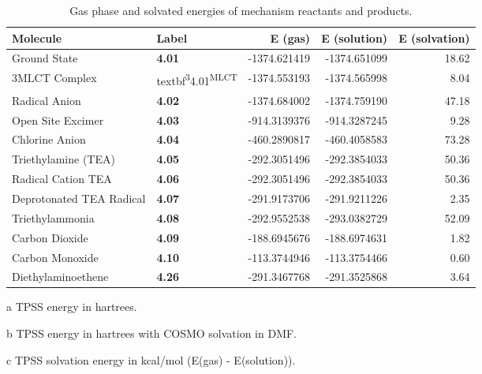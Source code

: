 \begin{table}[!htb]
\centering
 \begin{threeparttable}
  \caption[Gas phase and solvated energies for mechanism reactants and products]{Gas phase and solvated energies of mechanism reactants and products.}
    \begin{tabular}{llrrr}
    \toprule
    Molecule & Label & E (gas)\tnote{a} & E (solution)\tnote{b} & E (solvation)\tnote{c} \\
    \midrule
    Ground State & \textbf{4.01} & -1374.621419 & -1374.651099 & 18.62 \\
    3MLCT Complex & textbf{\textsuperscript{3}4.01\textsuperscript{MLCT}} & -1374.553193 & -1374.565998 & 8.04 \\
    Radical Anion & \textbf{4.02} & -1374.684002 & -1374.759190 & 47.18 \\
    Open Site Excimer & \textbf{4.03} & -914.3139376 & -914.3287245 & 9.28 \\
    Chlorine Anion & \textbf{4.04} & -460.2890817 & -460.4058583 & 73.28 \\
    Triethylamine (TEA) & \textbf{4.05} & -292.3051496 & -292.3854033 & 50.36 \\
    Radical Cation TEA & \textbf{4.06} & -292.3051496 & -292.3854033 & 50.36 \\
    Deprotonated TEA Radical & \textbf{4.07} & -291.9173706 & -291.9211226 & 2.35 \\
    Triethylammonia & \textbf{4.08} & -292.9552538 & -293.0382729 & 52.09 \\
    Carbon Dioxide & \textbf{4.09} & -188.6945676 & -188.6974631 & 1.82 \\
    Carbon Monoxide & \textbf{4.10} & -113.3744946 & -113.3754466 & 0.60 \\
    Diethylaminoethene & \textbf{4.26} & -291.3467768 & -291.3525868 & 3.64 \\
    \bottomrule
    \end{tabular}%
    \begin{tablenotes}
    \item [a] TPSS energy in hartrees.
    \item [b] TPSS energy in hartrees with COSMO solvation in DMF.
    \item [c] TPSS solvation energy in kcal/mol (E(gas) - E(solution)).
    \end{tablenotes}
  \label{tab.supenergy}%
 \end{threeparttable}
\end{table}%


